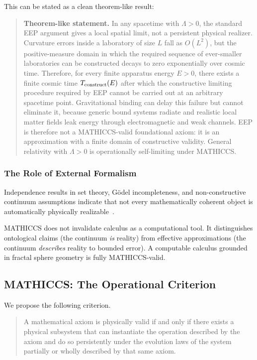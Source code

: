 \documentclass[11pt,a4paper]{article}
\begin{document}
This can be stated as a clean theorem-like result:

\begin{quote}
\textbf{Theorem-like statement.} In any spacetime with $\Lambda>0$, the standard EEP argument gives a local spatial limit, not a persistent physical realizer. Curvature errors inside a laboratory of size $L$ fall as $O(L^2)$, but the positive-measure domain in which the required sequence of ever-smaller laboratories can be constructed decays to zero exponentially over cosmic time. Therefore, for every finite apparatus energy $E>0$, there exists a finite cosmic time $T_{\rm construct}(E)$ after which the constructive limiting procedure required by EEP cannot be carried out at an arbitrary spacetime point. Gravitational binding can delay this failure but cannot eliminate it, because generic bound systems radiate and realistic local matter fields leak energy through electromagnetic and weak channels. EEP is therefore not a MATHICCS-valid foundational axiom: it is an approximation with a finite domain of constructive validity. General relativity with $\Lambda>0$ is operationally self-limiting under MATHICCS.
\end{quote}

\subsubsection{The Role of External Formalism}

Independence results in set theory, Gödel incompleteness, and non-constructive continuum assumptions indicate that not every mathematically coherent object is automatically physically realizable~\cite{Godel1931}.

MATHICCS does not invalidate calculus as a computational tool. It distinguishes ontological claims (the continuum \emph{is} reality) from effective approximations (the continuum \emph{describes} reality to bounded error). A computable calculus grounded in fractal sphere geometry is fully MATHICCS-valid.

\subsection{MATHICCS: The Operational Criterion}

We propose the following criterion.

\begin{quote}
A mathematical axiom is physically valid if and only if there exists a physical subsystem that can instantiate the operation described by the axiom and do so persistently under the evolution laws of the system partially or wholly described by that same axiom.
\end{quote}
\end{document}
